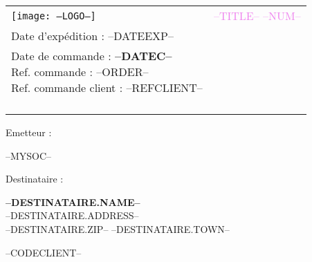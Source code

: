 \newcommand{\FOOT}{--FOOT--\\
P\'enalit\'e pour paiement tardif : inter\^et l\'egal x3 et une indemnit\'e forfaitaire pour frais de recouvrement de 40 euros. R\`eglement anticip\'e, pas d'escompte.}

\newcommand{\specialcell}[2][c]{
	\parbox[#1]{6.3cm}{#2}}
	
\begin{tabular}{p{9cm} p{8cm}}
    \vspace{0pt} 
    \texttt{[image: --LOGO--]}
    & 
    \vspace{0pt}
   \raggedleft
	\textcolor{violet}{\textsc{\Large --TITLE-- --NUM--}}\\
	Date d'exp\'edition : --DATEEXP--\\
    {\small Date de commande : \textbf{--DATEC--}\\
	Ref. commande : --ORDER--\\
	Ref. commande client : --REFCLIENT--\\}~\\
\end{tabular}


\begin{minipage}[t]{0.40\textwidth}
{\small Emetteur :}\\
\begin{fminipage}
--MYSOC--
\end{fminipage}
\end{minipage}
\hspace{1cm}
\begin{minipage}[t]{0.52\textwidth}
{\small Destinataire :}

\begin{fminipage}
\textbf{\large --DESTINATAIRE.NAME--}\\
--DESTINATAIRE.ADDRESS--\\
\textsc{--DESTINATAIRE.ZIP-- --DESTINATAIRE.TOWN--}\\
\begin{minipage}{\textwidth}
\flushright
{\tiny --CODECLIENT--}
\end{minipage}
\end{fminipage}
\end{minipage}

\begin{minipage}[t]{0.60\textwidth}
\end{minipage}
\hspace{1cm}
\begin{minipage}[t]{0.32\textwidth}
\begin{flushright}
{\it Livraison : {--DELIVERYMODE--}\\
{\it Date prévisionnelle : \textbf{--DATEEXP--}\\
\vspace{1em}
{\footnotesize \textit{Montants exprimés en €}}
\end{flushright}
\end{minipage}

